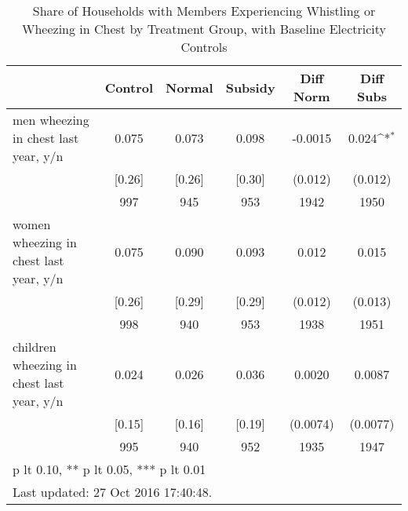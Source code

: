 \begin{table}[htbp]\centering
\def\sym#1{\ifmmode^{#1}\else\(^{#1}\)\fi}
\caption{Share of Households with Members Experiencing Whistling or Wheezing in Chest by Treatment Group, with Baseline Electricity Controls \label{tab:"balance"}}
\begin{tabular*}{0.9\hsize}{@{\hskip\tabcolsep\extracolsep\fill}l*{1}{ccccc}}
\toprule
                                &  Control&   Normal&  Subsidy&Diff Norm         &Diff Subs         \\
\midrule
men wheezing in chest last year, y/n&    0.075&    0.073&    0.098&  -0.0015         &    0.024\sym{*}  \\
                                &   [0.26]&   [0.26]&   [0.30]&  (0.012)         &  (0.012)         \\
                                &      997&      945&      953&     1942         &     1950         \\
women wheezing in chest last year, y/n&    0.075&    0.090&    0.093&    0.012         &    0.015         \\
                                &   [0.26]&   [0.29]&   [0.29]&  (0.012)         &  (0.013)         \\
                                &      998&      940&      953&     1938         &     1951         \\
children wheezing in chest last year, y/n&    0.024&    0.026&    0.036&   0.0020         &   0.0087         \\
                                &   [0.15]&   [0.16]&   [0.19]& (0.0074)         & (0.0077)         \\
                                &      995&      940&      952&     1935         &     1947         \\
\bottomrule
\multicolumn{6}{l}{\footnotesize * p lt 0.10, ** p lt 0.05, *** p lt 0.01}\\
\multicolumn{6}{l}{\footnotesize Last updated: 27 Oct 2016 17:40:48.}\\
\end{tabular*}
\end{table}
